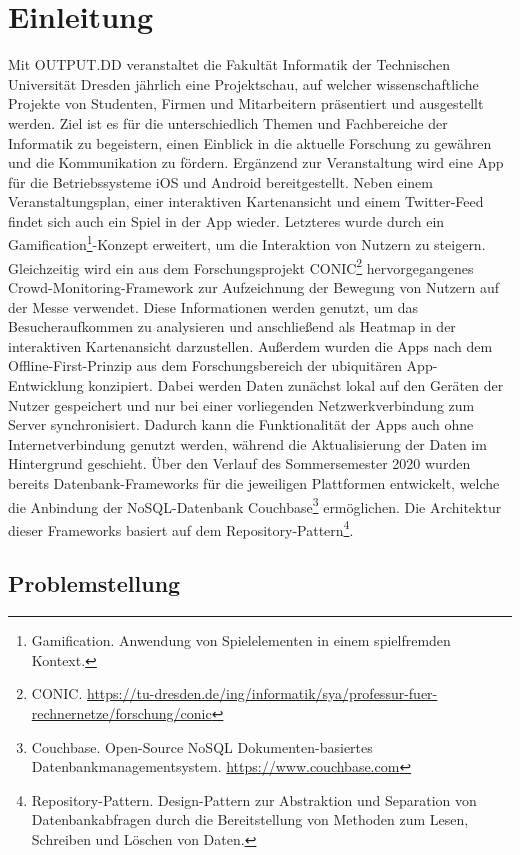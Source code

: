 \chapter{Einleitung}\label{ch:einleitung}

Mit OUTPUT.DD veranstaltet die Fakultät Informatik der Technischen Universität Dresden jährlich eine Projektschau, auf welcher wissenschaftliche Projekte von Studenten, Firmen und Mitarbeitern präsentiert und ausgestellt werden. Ziel ist es für die unterschiedlich Themen und Fachbereiche der Informatik zu begeistern, einen Einblick in die aktuelle Forschung zu gewähren und die Kommunikation zu fördern. Ergänzend zur Veranstaltung wird eine App für die Betriebssysteme iOS und Android bereitgestellt. Neben einem Veranstaltungsplan, einer interaktiven Kartenansicht und einem Twitter-Feed findet sich auch ein Spiel in der App wieder. Letzteres wurde durch ein Gamification\footnote{Gamification. Anwendung von Spielelementen in einem spielfremden Kontext.}-Konzept erweitert, um die Interaktion von Nutzern zu steigern. Gleichzeitig wird ein aus dem Forschungsprojekt CONIC\footnote{CONIC. \url{https://tu-dresden.de/ing/informatik/sya/professur-fuer-rechnernetze/forschung/conic}} hervorgegangenes Crowd-Monitoring-Framework zur Aufzeichnung der Bewegung von Nutzern auf der Messe verwendet. Diese Informationen werden genutzt, um das Besucheraufkommen zu analysieren und anschließend als Heatmap in der interaktiven Kartenansicht darzustellen. Außerdem wurden die Apps nach dem Offline-First-Prinzip aus dem Forschungsbereich der ubiquitären App-Entwicklung konzipiert. Dabei werden Daten zunächst lokal auf den Geräten der Nutzer gespeichert und nur bei einer vorliegenden Netzwerkverbindung zum Server synchronisiert. Dadurch kann die Funktionalität der Apps auch ohne Internetverbindung genutzt werden, während die Aktualisierung der Daten im Hintergrund geschieht. Über den Verlauf des Sommersemester 2020 wurden bereits Datenbank-Frameworks für die jeweiligen Plattformen entwickelt, welche die Anbindung der NoSQL-Datenbank Couchbase\footnote{Couchbase. Open-Source NoSQL Dokumenten-basiertes Datenbankmanagementsystem. \newline \url{https://www.couchbase.com}} ermöglichen. Die Architektur dieser Frameworks basiert auf dem Repository-Pattern\footnote{Repository-Pattern. Design-Pattern zur Abstraktion und Separation von Datenbankabfragen durch die Bereitstellung von Methoden zum Lesen, Schreiben und Löschen von Daten.}.

\section{Problemstellung}\label{sec:problem}

